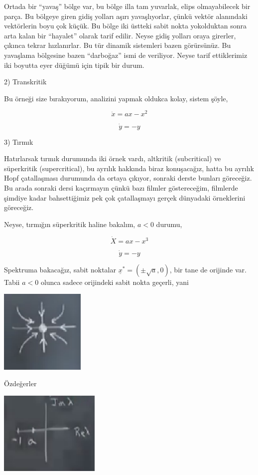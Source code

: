 \documentclass[12pt,fleqn]{article}\usepackage{../../common}
\begin{document}
Ortada bir ``yavaş'' bölge var, bu bölge illa tam yuvarlak, elips olmayabilecek
bir parça. Bu bölgeye giren gidiş yolları aşırı yavaşlıyorlar, çünkü vektör
alanındaki vektörlerin boyu çok küçük. Bu bölge iki üstteki sabit nokta
yokolduktan sonra arta kalan bir ``hayalet'' olarak tarif edilir. Neyse gidiş
yolları oraya girerler, çıkınca tekrar hızlanırlar. Bu tür dinamik sistemleri
bazen görürsünüz. Bu yavaşlama bölgesine bazen ``darboğaz'' ismi de
veriliyor. Neyse tarif ettiklerimiz iki boyutta eyer düğümü için tipik bir
durum.

2) Transkritik

Bu örneği size bırakıyorum, analizini yapmak oldukca kolay, sistem şöyle,

$$ \dot{x} = ax-x^2 $$

$$ \dot{y} = -y $$

3) Tırmık

Hatırlarsak tırmık durumunda iki örnek vardı, altkritik (subcritical) ve
süperkritik (supercritical), bu ayrılık hakkında biraz konuşacağız, hatta bu
ayrılık Hopf çatallaşması durumunda da ortaya çıkıyor, sonraki derste bunları
göreceğiz. Bu arada sonraki dersi kaçırmayın çünkü bazı filmler göstereceğim,
filmlerde şimdiye kadar bahsettiğimiz pek çok çatallaşmayı gerçek dünyadaki
örneklerini göreceğiz.

Neyse, tırmığın süperkritik haline bakalım, $a<0$ durumu,

$$ \dot{X} = ax-x^3 $$

$$ \dot{y} = -y $$

Spektruma bakacağız, sabit noktalar $\underline{x}^\ast = (\pm \sqrt{a}, 0)$, bir
tane de orijinde var. Tabii $a<0$ olunca sadece orijindeki sabit nokta geçerli,
yani

\includegraphics[height=4cm]{12_16.png}

Özdeğerler

\includegraphics[height=4cm]{12_17.png}
\end{document}
